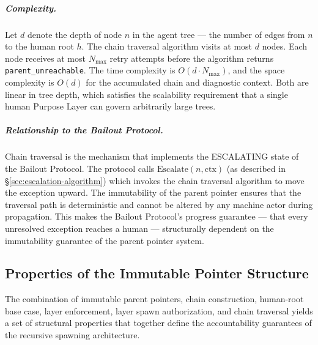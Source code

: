 \subparagraph{Complexity.} Let $d$ denote the depth of node $n$ in the agent tree — the number of edges from $n$ to the human root $h$. The chain traversal algorithm visits at most $d$ nodes. Each node receives at most $N_{\max}$ retry attempts before the algorithm returns \texttt{parent\_unreachable}. The time complexity is $O(d \cdot N_{\max})$, and the space complexity is $O(d)$ for the accumulated chain and diagnostic context. Both are linear in tree depth, which satisfies the scalability requirement that a single human Purpose Layer can govern arbitrarily large trees.

\subparagraph{Relationship to the Bailout Protocol.} Chain traversal is the mechanism that implements the ESCALATING state of the Bailout Protocol. The protocol calls $\text{Escalate}(n, \text{ctx})$ (as described in \S\ref{sec:escalation-algorithm}) which invokes the chain traversal algorithm to move the exception upward. The immutability of the parent pointer ensures that the traversal path is deterministic and cannot be altered by any machine actor during propagation. This makes the Bailout Protocol's progress guarantee — that every unresolved exception reaches a human — structurally dependent on the immutability guarantee of the parent pointer system.

\subsection{Properties of the Immutable Pointer Structure}

The combination of immutable parent pointers, chain construction, human-root base case, \fact{} layer enforcement, \purpose{} layer spawn authorization, and chain traversal yields a set of structural properties that together define the accountability guarantees of the \bxthree{} recursive spawning architecture.

